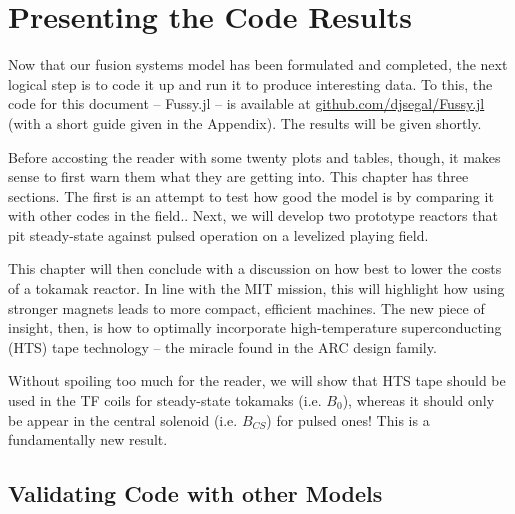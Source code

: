 %
%
%
%
%
%
%
%

\chapter{Presenting the Code Results}

Now that our fusion systems model has been formulated and completed, the next logical step is to code it up and run it to produce interesting data. To this, the code for this document -- Fussy.jl -- is available at \href{https://github.com/djsegal/Fussy.jl}{github.com/djsegal/Fussy.jl} (with a short guide given in the Appendix). The results will be given shortly.

Before accosting the reader with some twenty plots and tables, though, it makes sense to first warn them what they are getting into. This chapter has three sections. The first is an attempt to test how good the model is by comparing it with other codes in the field.\cite{arc,eupulsed,process}. Next, we will develop two prototype reactors that pit steady-state against pulsed operation on a levelized playing field.

This chapter will then conclude with a discussion on how best to lower the costs of a tokamak reactor. In line with the MIT mission, this will highlight how using stronger magnets leads to more compact, efficient machines. The new piece of insight, then, is how to optimally incorporate high-temperature superconducting (HTS) tape technology -- the miracle found in the ARC design family. 

Without spoiling too much for the reader, we will show that HTS tape should be used in the TF coils for steady-state tokamaks (i.e. $B_0$), whereas it should only be appear in the central solenoid (i.e. $B_{CS}$) for pulsed ones! This is a fundamentally new result.

\section{Validating Code with other Models}

